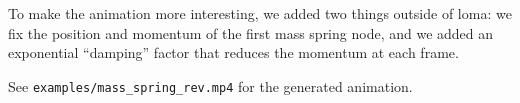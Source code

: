 To make the animation more interesting, we added two things outside of loma: we fix the position and momentum of the first mass spring node, and we added an exponential ``damping'' factor that reduces the momentum at each frame.

See \lstinline{examples/mass_spring_rev.mp4} for the generated animation.


